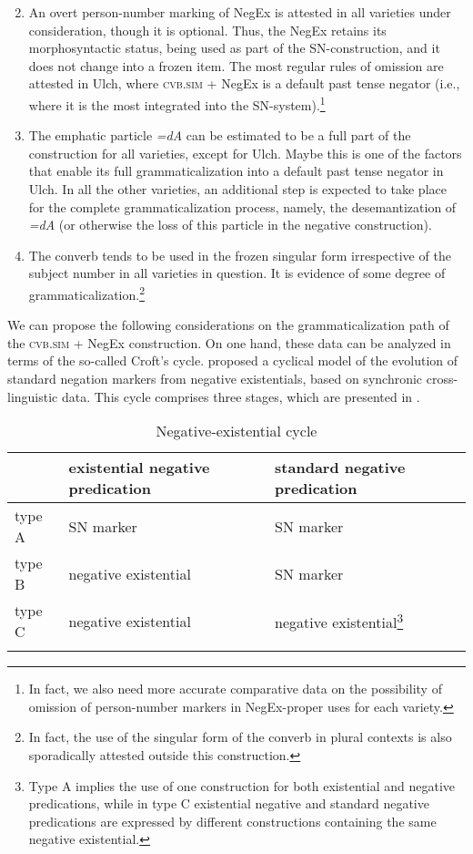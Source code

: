 \documentclass[output=paper,colorlinks,citecolor=brown]{langscibook}
\begin{document}
\begin{enumerate}
    \setcounter{enumi}{1}
    \item An overt person-number marking of NegEx is attested in all varieties under consideration, though it is optional. Thus, the NegEx retains its morphosyntactic status, being used as part of the SN-construction, and it does not change into a frozen item. The most regular rules of omission are attested in Ulch, where \textsc{cvb.sim} + NegEx is a default past tense negator (i.e., where it is the most integrated into the SN-system).\footnote{In fact, we also need more accurate comparative data on the possibility of omission of person-number markers in NegEx-proper uses for each variety.}
    \item The emphatic particle \textit{=dA} can be estimated to be a full part of the construction for all varieties, except for Ulch. Maybe this is one of the factors that enable its full grammaticalization into a default past tense negator in Ulch. In all the other varieties, an additional step is expected to take place for the complete grammaticalization process, namely, the desemantization of \textit{=dA} (or otherwise the loss of this particle in the negative construction).
    \item The converb tends to be used in the frozen singular form irrespective of the subject number in all varieties in question. It is evidence of some degree of grammaticalization.\footnote{In fact, the use of the singular form of the converb in plural contexts is also sporadically attested outside this construction.}
\end{enumerate}

We can propose the following considerations on the grammaticalization path of the \textsc{cvb.sim} + NegEx construction. On one hand, these data can be analyzed in terms of the so-called Croft’s cycle. \citet{Croft1991} proposed a cyclical model of the evolution of standard negation markers from negative existentials, based on synchronic cross-linguistic data. This cycle comprises three stages, which are presented in .

\begin{table}
    \caption{Negative-existential cycle \citep{Croft1991}}
    \label{tab:T9}
    \begin{tabular}{lll}
    \lsptoprule
     & existential negative predication & standard negative predication \\ \midrule
    type A & SN marker & SN marker \\
    type B & negative existential & SN marker \\
    type C & negative existential & negative existential\footnote{Type A implies the use of one construction for both existential and negative predications, while in type C existential negative and standard negative predications are expressed by different constructions containing the same negative existential.}
    \\ \lspbottomrule
    \end{tabular}
\end{table}
\end{document}
